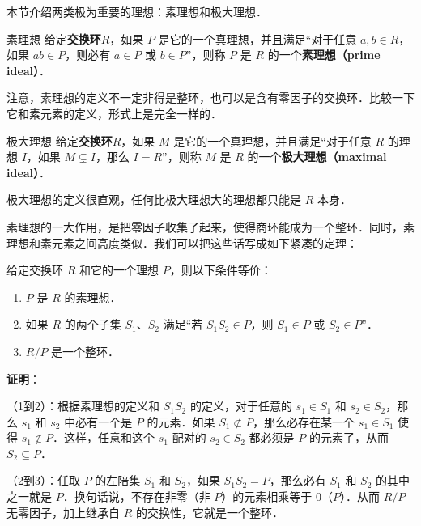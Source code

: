 

本节介绍两类极为重要的理想：素理想和极大理想．





\begin{definition}{素理想}
给定\textbf{交换环}$R$，如果 $P$ 是它的一个真理想，并且满足“对于任意 $a, b\in R$，如果 $ab\in P$，则必有 $a\in P$ 或 $b\in P$”，则称 $P$ 是 $R$ 的一个\textbf{素理想（prime ideal）}．
\end{definition}

注意，素理想的定义不一定非得是整环，也可以是含有零因子的交换环．比较一下它和素元素的定义，形式上是完全一样的．

\begin{definition}{极大理想}
给定\textbf{交换环}$R$，如果 $M$ 是它的一个真理想，并且满足“对于任意 $R$ 的理想 $I$，如果 $M\subsetneq I$，那么 $I=R$”，则称 $M$ 是 $R$ 的一个\textbf{极大理想（maximal ideal）}．
\end{definition}

极大理想的定义很直观，任何比极大理想大的理想都只能是 $R$ 本身．

素理想的一大作用，是把零因子收集了起来，使得商环能成为一个整环．同时，素理想和素元素之间高度类似．我们可以把这些话写成如下紧凑的定理：

\begin{theorem}{}\label{Ideals_the1}
给定交换环 $R$ 和它的一个理想 $P$，则以下条件等价：
\begin{enumerate}
\item $P$ 是 $R$ 的素理想．
\item 如果 $R$ 的两个子集 $S_1$、$S_2$ 满足“若 $S_1S_2\in P$，则 $S_1\in P$ 或 $S_2\in P$”．
\item $R/P$ 是一个整环．
\end{enumerate}
\end{theorem}

\textbf{证明}：

（1到2）：根据素理想的定义和 $S_1S_2$ 的定义，对于任意的 $s_1\in S_1$ 和 $s_2\in S_2$，那么 $s_1$ 和 $s_2$ 中必有一个是 $P$ 的元素．如果 $S_1\not\subset P$，那么必存在某一个 $s_1\in S_1$ 使得 $s_1\not\in P$．这样，任意和这个 $s_1$ 配对的 $s_2\in S_2$ 都必须是 $P$ 的元素了，从而 $S_2\subseteq P$．

（2到3）：任取 $P$ 的左陪集 $S_1$ 和 $S_2$，如果 $S_1S_2=P$，那么必有 $S_1$ 和 $S_2$ 的其中之一就是 $P$．换句话说，不存在非零（非 $P$）的元素相乘等于 $0$（$P$）．从而 $R/P$ 无零因子，加上继承自 $R$ 的交换性，它就是一个整环．

